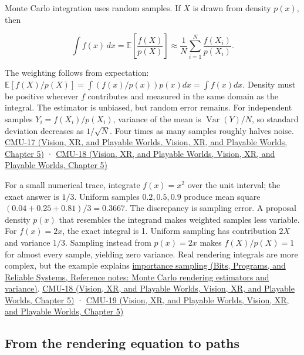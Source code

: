 Monte Carlo integration uses random samples. If \(X\) is drawn from density \(p(x)\), then

\[
\int f(x)\,dx=\mathbb E\left[\frac{f(X)}{p(X)}\right]\approx\frac1N\sum_{i=1}^N\frac{f(X_i)}{p(X_i)}.
\]

The weighting follows from expectation: \(\mathbb E[f(X)/p(X)]=\int (f(x)/p(x))p(x)dx=\int f(x)dx\). Density must be positive wherever \(f\) contributes and measured in the same domain as the integral. The estimator is unbiased, but random error remains. For independent samples \(Y_i=f(X_i)/p(X_i)\), variance of the mean is \(\operatorname{Var}(Y)/N\), so standard deviation decreases as \(1/\sqrt N\). Four times as many samples roughly halves noise. \href{../07-Vision-XR-and-Playable-Worlds/main.pdf\#nameddest=04-visual-computing-ii-ch036-cmu-17---numerical-integration}{CMU-17 (Vision, XR, and Playable Worlds, Vision, XR, and Playable Worlds, Chapter 5)} · \href{../07-Vision-XR-and-Playable-Worlds/main.pdf\#nameddest=04-visual-computing-ii-ch036-cmu-18---monte-carlo-rendering}{CMU-18 (Vision, XR, and Playable Worlds, Vision, XR, and Playable Worlds, Chapter 5)}

For a small numerical trace, integrate \(f(x)=x^2\) over the unit interval; the exact answer is \(1/3\). Uniform samples \(0.2,0.5,0.9\) produce mean square \((0.04+0.25+0.81)/3=0.3667\). The discrepancy is sampling error. A proposal density \(p(x)\) that resembles the integrand makes weighted samples less variable. For \(f(x)=2x\), the exact integral is 1. Uniform sampling has contribution \(2X\) and variance \(1/3\). Sampling instead from \(p(x)=2x\) makes \(f(X)/p(X)=1\) for almost every sample, yielding zero variance. Real rendering integrals are more complex, but the example explains \href{../01-Bits-Programs-and-Reliable-Systems/main.pdf\#nameddest=appendix-031e02bf28af}{importance sampling (Bits, Programs, and Reliable Systems, Reference notes: Monte Carlo rendering estimators and variance)}. \href{../07-Vision-XR-and-Playable-Worlds/main.pdf\#nameddest=04-visual-computing-ii-ch036-cmu-18---monte-carlo-rendering}{CMU-18 (Vision, XR, and Playable Worlds, Vision, XR, and Playable Worlds, Chapter 5)} · \href{../07-Vision-XR-and-Playable-Worlds/main.pdf\#nameddest=04-visual-computing-ii-ch036-cmu-19---variance-reduction}{CMU-19 (Vision, XR, and Playable Worlds, Vision, XR, and Playable Worlds, Chapter 5)}

\subsection{From the rendering equation to paths}\label{03-visual-computing-i-ch011-from-the-rendering-equation-to-paths}

